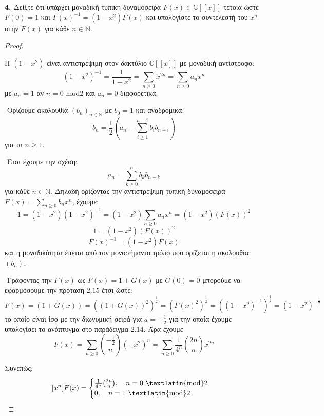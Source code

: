 \documentclass[oneside,a4paper]{article}
\newcommand {\tl}{\textlatin}
\begin{document}
\textbf{4. } Δείξτε ότι υπάρχει μοναδική τυπική δυναμοσειρά $F(x) \in \mathbb{C}[[x]]$ τέτοια ώστε $F(0)=1$ και $F(x)^{-1} = (1-x^2) F(x)$ και υπολογίστε το συντελεστή του $x^n$ στην $F(x)$ για κάθε $n \in \mathbb{N}$.


\begin{proof} $ $
	$ $\newline

	Η $(1-x^2)$ είναι αντιστρέψιμη στον δακτύλιο $\mathbb{C}[[x]]$ με μοναδική αντίστροφο:
	$$(1-x^2)^{-1} = \frac1{1-x^2} = \sum\limits_{n\geq 0} x^{2n} = \sum\limits_{n\geq 0} a_n x^n$$
	με $a_n = 1$ αν $n = 0$ \tl{mod}$2$ και $a_n = 0$ διαφορετικά.

	$ $\newline
	Ορίζουμε ακολουθία $(b_n)_{n \in \mathbb{N}}$ με $b_0 = 1$ και αναδρομικά: 
	$$b_n = \frac12 \left( a_n - \sum\limits_{i\geq 1}^{n-1} b_i b_{n-i} \right)$$
	για τα $n\geq 1$.
	
	$ $\newline
	Έτσι έχουμε την σχέση:
	$$a_n = \sum\limits_{k\geq 0}^n b_k b_{n-k}$$
	για κάθε $n\in \mathbb{N}$. Δηλαδή ορίζοντας την αντιστρέψιμη τυπική δυναμοσειρά $F(x) = \sum\limits_{n\geq 0} b_n x^n$, έχουμε:
	$$ 1 = (1-x^2) (1-x^2)^{-1} = (1-x^2) \sum\limits_{n\geq 0} a_n x^n = (1-x^2) (F(x))^2$$
	$$ 1 = (1-x^2) (F(x))^2$$
	$$ F(x)^{-1} = (1-x^2) F(x)$$
	και η μοναδικότητα έπεται από τον μονοσήμαντο τρόπο που ορίζεται η ακολουθία $(b_n)$.

	$ $\newline
	Γράφοντας την $F(x)$ ως $F(x) = 1 + G(x)$ με $G(0) = 0$ μπορούμε να εφαρμόσουμε την πρόταση $2.15$ έτσι ώστε:
	$$F(x) = (1+G(x)) = \left(\left(1+G(x)\right)^{2}\right)^{\frac12} = (F(x)^2)^{\frac12} = \left((1-x^2)^{-1}\right)^{\frac12} = (1-x^2)^{-\frac12}$$
	το οποίο είναι ίσο με την διωνυμική σειρά για $a=-\frac12$ για την οποία έχουμε υπολογίσει το ανάπτυγμα στο παράδειγμα $2.14$. Άρα έχουμε
	$$F(x) = \sum\limits_{n\geq 0} \binom{-\frac12}{n} (-x^2)^n = \sum\limits_{n\geq 0} \frac1{4^n} \binom{2n}{n} x^{2n}$$

	Συνεπώς:
	$$[x^n]F(x) = 
	\begin{cases}
		\frac1{4^n} \binom{2n}{n}, \quad n = 0 \text{ \tl{mod}}2 \\
		0, \quad n = 1 \text{ \tl{mod}}2
	\end{cases}$$
\end{proof}
\end{document}

